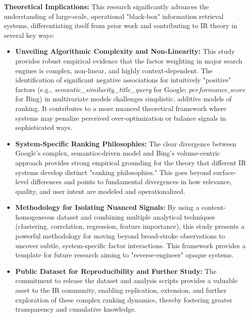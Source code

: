 \documentclass[a4paper,fleqn]{cas-sc}
\newcommand{\longvar}[1]{\textit{#1}}
\begin{document}
\textbf{Theoretical Implications:} This research significantly advances the understanding of large-scale, operational "black-box" information retrieval systems, differentiating itself from prior work and contributing to IR theory in several key ways:
\begin{itemize}
\item \textbf{Unveiling Algorithmic Complexity and Non-Linearity:} This study provides robust empirical evidence that the factor weighting in major search engines is complex, non-linear, and highly context-dependent. The identification of significant negative associations for intuitively "positive" factors (e.g., \longvar{semantic_similarity_title_query} for Google; $performance\_score$ for Bing) in multivariate models challenges simplistic, additive models of ranking. It contributes to a more nuanced theoretical framework where systems may penalize perceived over-optimization or balance signals in sophisticated ways.
\item \textbf{System-Specific Ranking Philosophies:} The clear divergence between Google's complex, semantics-driven model and Bing's volume-centric approach provides strong empirical grounding for the theory that different IR systems develop distinct "ranking philosophies." This goes beyond surface-level differences and points to fundamental divergences in how relevance, quality, and user intent are modeled and operationalized.
\item \textbf{Methodology for Isolating Nuanced Signals:} By using a content-homogeneous dataset and combining multiple analytical techniques (clustering, correlation, regression, feature importance), this study presents a powerful methodology for moving beyond broad-stroke observations to uncover subtle, system-specific factor interactions. This framework provides a template for future research aiming to "reverse-engineer" opaque systems.
\item \textbf{Public Dataset for Reproducibility and Further Study:} The commitment to release the dataset and analysis scripts provides a valuable asset to the IR community, enabling replication, extension, and further exploration of these complex ranking dynamics, thereby fostering greater transparency and cumulative knowledge.
\end{itemize}
\end{document}
